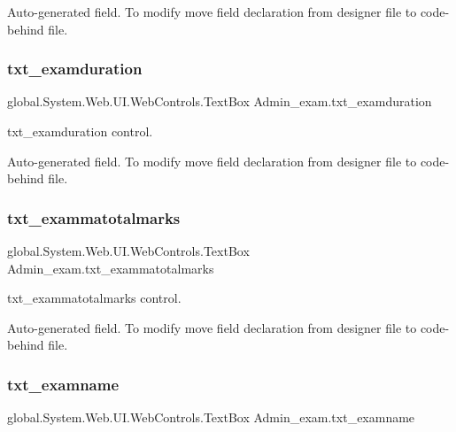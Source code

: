 Auto-\/generated field. To modify move field declaration from designer file to code-\/behind file. \mbox{\label{class_admin__exam_a901c430fc370e8e2c58896b93dae29c3}} 
\subsubsection{\texorpdfstring{txt\_examduration}{txt\_examduration}}
{\footnotesize\ttfamily global.\+System.\+Web.\+U\+I.\+Web\+Controls.\+Text\+Box Admin\+\_\+exam.\+txt\+\_\+examduration\hspace{0.3cm}{\ttfamily [protected]}}



txt\+\_\+examduration control. 

Auto-\/generated field. To modify move field declaration from designer file to code-\/behind file. \mbox{\label{class_admin__exam_aad1c3d4c877bf9551b4d5d7f1c085eb4}} 
\subsubsection{\texorpdfstring{txt\_exammatotalmarks}{txt\_exammatotalmarks}}
{\footnotesize\ttfamily global.\+System.\+Web.\+U\+I.\+Web\+Controls.\+Text\+Box Admin\+\_\+exam.\+txt\+\_\+exammatotalmarks\hspace{0.3cm}{\ttfamily [protected]}}



txt\+\_\+exammatotalmarks control. 

Auto-\/generated field. To modify move field declaration from designer file to code-\/behind file. \mbox{\label{class_admin__exam_a772d0b25d58e29126cf44b81f2a2f469}} 
\subsubsection{\texorpdfstring{txt\_examname}{txt\_examname}}
{\footnotesize\ttfamily global.\+System.\+Web.\+U\+I.\+Web\+Controls.\+Text\+Box Admin\+\_\+exam.\+txt\+\_\+examname\hspace{0.3cm}{\ttfamily [protected]}}



